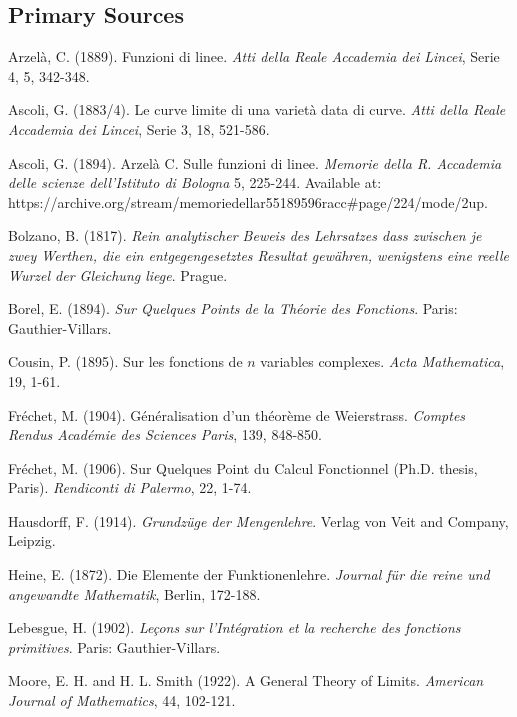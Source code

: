 \documentclass[12pt]{article}
\begin{document}
\begin{thebibliography}{99}

\subsection*{Primary Sources}

 Arzel\`{a}, C. (1889). Funzioni di linee. {\em Atti della Reale Accademia dei Lincei}, Serie 4, 5, 342-348.

 Ascoli, G. (1883/4). Le curve limite di una variet\`{a} data di curve. {\em Atti della Reale Accademia dei Lincei}, Serie 3, 18, 521-586.

 Ascoli, G. (1894). Arzel\`{a} C. Sulle funzioni di linee. {\em Memorie della R. Accademia delle scienze dell'Istituto di Bologna} 5, 225-244. Available at: https://archive.org/stream/memoriedellar55189596racc\#page/224/mode/2up.

 Bolzano, B. (1817). {\em Rein analytischer Beweis des Lehrsatzes dass zwischen je zwey Werthen, die ein entgegengesetztes Resultat gew\"{a}hren, wenigstens eine reelle Wurzel der Gleichung liege}. Prague.

 Borel, E. (1894). {\em Sur Quelques Points de la Th\'{e}orie des Fonctions}. Paris: Gauthier-Villars.

 Cousin, P. (1895). Sur les fonctions de $n$ variables complexes. {\em Acta Mathematica}, 19, 1-61.

 Fr\'{e}chet, M. (1904). G\'{e}n\'{e}ralisation d'un th\'{e}or\`{e}me de Weierstrass. {\em  Comptes Rendus Acad\'{e}mie des Sciences Paris}, 139, 848-850.

 Fr\'{e}chet, M. (1906). Sur Quelques Point du Calcul Fonctionnel (Ph.D. thesis, Paris). {\em Rendiconti di Palermo}, 22, 1-74.

 Hausdorff, F. (1914). {\em Grundz\"{u}ge der Mengenlehre}. Verlag von Veit and Company, Leipzig.

 Heine, E. (1872). Die Elemente der Funktionenlehre. {\em Journal f\"{u}r die reine und angewandte Mathematik}, Berlin, 172-188.

 Lebesgue, H. (1902). {\em Le\c{c}ons sur l'Int\'{e}gration et la recherche des fonctions primitives}. Paris: Gauthier-Villars.

 Moore, E. H. and H. L. Smith (1922). A General Theory of Limits.
{\em American Journal of Mathematics}, 44, 102-121.


\end{thebibliography}
\end{document}

